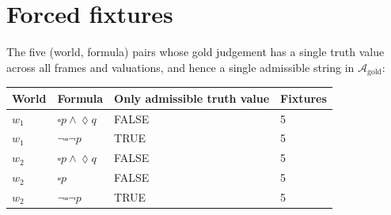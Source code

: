 \documentclass[11pt]{article}
\renewcommand{\Box}{\square}
\newcommand{\Dia}{\lozenge}
\begin{document}
\section{Forced fixtures}

The five (world, formula) pairs whose gold judgement has a single truth value across all frames and valuations, and hence a single admissible string in $\mathcal{A}_{\mathrm{gold}}$:
\begin{center}\small
\begin{tabular}{llll}
\toprule
World & Formula & Only admissible truth value & Fixtures \\
\midrule
$w_1$ & $\Box p \wedge \Dia q$ & FALSE & 5 \\
$w_1$ & $\neg\Box\neg p$ & TRUE & 5 \\
$w_2$ & $\Box p \wedge \Dia q$ & FALSE & 5 \\
$w_2$ & $\Box p$ & FALSE & 5 \\
$w_2$ & $\neg\Box\neg p$ & TRUE & 5 \\
\bottomrule
\end{tabular}
\end{center}
\end{document}
